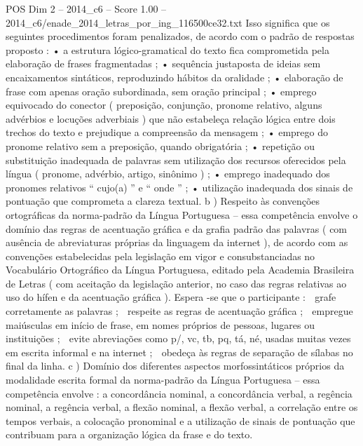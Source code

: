 \begin{textsample}{POS Dim 2 – 2014\_c6 – Score 1.00 – 2014\_c6/enade\_2014\_letras\_por\_ing\_116500ce32.txt}
Isso significa que os seguintes procedimentos foram penalizados, de acordo com o padrão de respostas proposto : • a estrutura lógico-gramatical do texto fica comprometida pela elaboração de frases fragmentadas ; • sequência justaposta de ideias sem encaixamentos sintáticos, reproduzindo hábitos da oralidade ; • elaboração de frase com apenas oração subordinada, sem oração principal ; • emprego equivocado do conector ( preposição, conjunção, pronome relativo, alguns advérbios e locuções adverbiais ) que não estabeleça relação lógica entre dois trechos do texto e prejudique a compreensão da mensagem ; • emprego do pronome relativo sem a preposição, quando obrigatória ; • repetição ou substituição inadequada de palavras sem utilização dos recursos oferecidos pela língua ( pronome, advérbio, artigo, sinônimo ) ; • emprego inadequado dos pronomes relativos “ cujo(a) ” e “ onde ” ; • utilização inadequada dos sinais de pontuação que comprometa a clareza textual. b ) Respeito às convenções ortográficas da norma-padrão da Língua Portuguesa – essa competência envolve o domínio das regras de acentuação gráfica e da grafia padrão das palavras ( com ausência de abreviaturas próprias da linguagem da internet ), de acordo com as convenções estabelecidas pela legislação em vigor e consubstanciadas no Vocabulário Ortográfico da Língua Portuguesa, editado pela Academia Brasileira de Letras ( com aceitação da legislação anterior, no caso das regras relativas ao uso do hífen e da acentuação gráfica ).
Espera -se que o participante :  grafe corretamente as palavras ;  respeite as regras de acentuação gráfica ;  empregue maiúsculas em início de frase, em nomes próprios de pessoas, lugares ou instituições ;  evite abreviações como p/, vc, tb, pq, tá, né, usadas muitas vezes em escrita informal e na internet ;  obedeça às regras de separação de sílabas no final da linha. c ) Domínio dos diferentes aspectos morfossintáticos próprios da modalidade escrita formal da norma-padrão da Língua Portuguesa – essa competência envolve : a concordância nominal, a concordância verbal, a regência nominal, a regência verbal, a flexão nominal, a flexão verbal, a correlação entre os tempos verbais, a colocação pronominal e a utilização de sinais de pontuação que contribuam para a organização lógica da frase e do texto.

\end{textsample}
